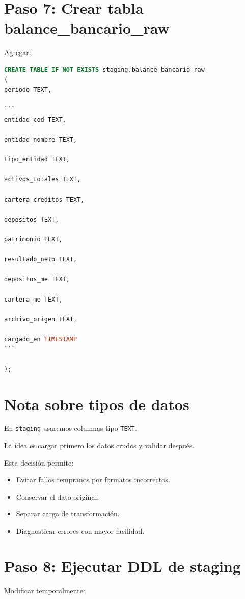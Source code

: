 \section{Paso 7: Crear tabla balance_bancario_raw}

Agregar:

\begin{lstlisting}[language=SQL]
CREATE TABLE IF NOT EXISTS staging.balance_bancario_raw
(
periodo TEXT,

```
entidad_cod TEXT,

entidad_nombre TEXT,

tipo_entidad TEXT,

activos_totales TEXT,

cartera_creditos TEXT,

depositos TEXT,

patrimonio TEXT,

resultado_neto TEXT,

depositos_me TEXT,

cartera_me TEXT,

archivo_origen TEXT,

cargado_en TIMESTAMP
```

);
\end{lstlisting}

\section{Nota sobre tipos de datos}

En \texttt{staging} usaremos columnas tipo \texttt{TEXT}.

La idea es cargar primero los datos crudos y validar después.

Esta decisión permite:

\begin{itemize}
\item Evitar fallos tempranos por formatos incorrectos.
\item Conservar el dato original.
\item Separar carga de transformación.
\item Diagnosticar errores con mayor facilidad.
\end{itemize}

\section{Paso 8: Ejecutar DDL de staging}

Modificar temporalmente:

